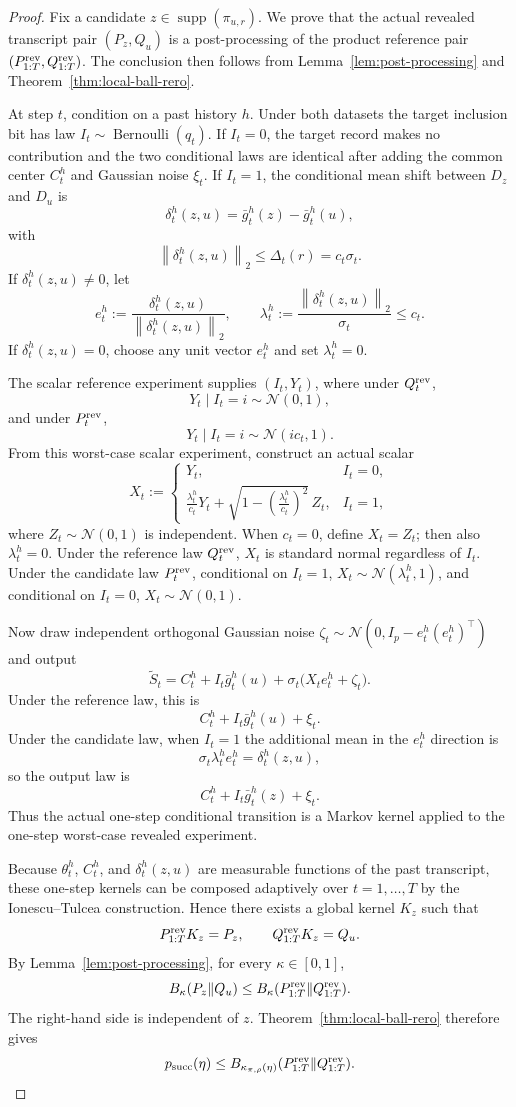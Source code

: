 \documentclass[11pt,a4paper]{report}
\theoremstyle{plain}
\theoremstyle{definition}
\theoremstyle{remark}
\DeclareMathOperator{\supp}{supp}
\DeclareMathOperator{\Ber}{Bernoulli}
\newcommand{\N}{\mathcal{N}}
\newcommand{\norm}[1]{\left\lVert #1\right\rVert}
\begin{document}
\begin{proof}
Fix a candidate $z\in\supp(\pi_{u,r})$.  We prove that the actual revealed
transcript pair $(P_z,Q_u)$ is a post-processing of the product reference pair
$(P_{1:T}^{\rm rev},Q_{1:T}^{\rm rev})$.  The conclusion then follows from
Lemma~\ref{lem:post-processing} and Theorem~\ref{thm:local-ball-rero}.

At step $t$, condition on a past history $h$.  Under both datasets the target
inclusion bit has law $I_t\sim\Ber(q_t)$.  If $I_t=0$, the target record makes
no contribution and the two conditional laws are identical after adding the
common center $C_t^h$ and Gaussian noise $\xi_t$.  If $I_t=1$, the conditional
mean shift between $D_z$ and $D_u$ is
\[
\delta_t^h(z,u)=\bar g_t^h(z)-\bar g_t^h(u),
\]
with
\[
\norm{\delta_t^h(z,u)}_2\le \Delta_t(r)=c_t\sigma_t.
\]
If $\delta_t^h(z,u)\ne0$, let
\[
e_t^h:=\frac{\delta_t^h(z,u)}{\norm{\delta_t^h(z,u)}_2},
\qquad
\lambda_t^h:=\frac{\norm{\delta_t^h(z,u)}_2}{\sigma_t}\le c_t.
\]
If $\delta_t^h(z,u)=0$, choose any unit vector $e_t^h$ and set
$\lambda_t^h=0$.

The scalar reference experiment supplies $(I_t,Y_t)$, where under
$Q_t^{\rm rev}$,
\[
Y_t\mid I_t=i\sim\N(0,1),
\]
and under $P_t^{\rm rev}$,
\[
Y_t\mid I_t=i\sim\N(ic_t,1).
\]
From this worst-case scalar experiment, construct an actual scalar
\[
X_t:=
\begin{cases}
Y_t, & I_t=0,\\
\displaystyle \frac{\lambda_t^h}{c_t}Y_t+\sqrt{1-\left(\frac{\lambda_t^h}{c_t}\right)^2}\,Z_t,
& I_t=1,
\end{cases}
\]
where $Z_t\sim\N(0,1)$ is independent.  When $c_t=0$, define $X_t=Z_t$; then
also $\lambda_t^h=0$.  Under the reference law $Q_t^{\rm rev}$, $X_t$ is
standard normal regardless of $I_t$.  Under the candidate law $P_t^{\rm rev}$,
conditional on $I_t=1$, $X_t\sim\N(\lambda_t^h,1)$, and conditional on
$I_t=0$, $X_t\sim\N(0,1)$.

Now draw independent orthogonal Gaussian noise
$\zeta_t\sim\N(0,I_p-e_t^h(e_t^h)^\top)$ and output
\[
\tilde S_t=C_t^h+I_t\bar g_t^h(u)+\sigma_t\bigl(X_te_t^h+\zeta_t\bigr).
\]
Under the reference law, this is
\[
C_t^h+I_t\bar g_t^h(u)+\xi_t.
\]
Under the candidate law, when $I_t=1$ the additional mean in the
$e_t^h$ direction is
\[
\sigma_t\lambda_t^h e_t^h=\delta_t^h(z,u),
\]
so the output law is
\[
C_t^h+I_t\bar g_t^h(z)+\xi_t.
\]
Thus the actual one-step conditional transition is a Markov kernel applied to
the one-step worst-case revealed experiment.

Because $\theta_t^h$, $C_t^h$, and $\delta_t^h(z,u)$ are measurable functions of
the past transcript, these one-step kernels can be composed adaptively over
$t=1,\ldots,T$ by the Ionescu--Tulcea construction.  Hence there exists a
global kernel $K_z$ such that
\[
P_{1:T}^{\rm rev}K_z=P_z,
\qquad
Q_{1:T}^{\rm rev}K_z=Q_u.
\]
By Lemma~\ref{lem:post-processing}, for every $\kappa\in[0,1]$,
\[
B_\kappa(P_z\|Q_u)
\le
B_\kappa(P_{1:T}^{\rm rev}\|Q_{1:T}^{\rm rev}).
\]
The right-hand side is independent of $z$.  Theorem~\ref{thm:local-ball-rero}
therefore gives
\[
p_{\rm succ}(\eta)
\le
B_{\kappa_{\pi,\rho}(\eta)}(P_{1:T}^{\rm rev}\|Q_{1:T}^{\rm rev}).
\]
\end{proof}
\end{document}

